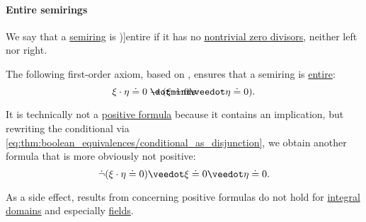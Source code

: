 \paragraph{Entire semirings}

\begin{definition}\label{def:entire_semiring}
  We say that a \hyperref[def:semiring]{semiring} is \term[ru=целостное (\cite[def. 3.5.1]{Винберг2014})]{entire} if it has no \hyperref[def:divisibility]{nontrivial zero divisors}, neither left nor right.
\end{definition}

\begin{remark}\label{rem:entire_semiring_axiom}
  The following first-order axiom, based on \cite[def. III.1.10]{Aluffi2009}, ensures that a semiring is \hyperref[def:entire_semiring]{entire}:
  \begin{equation}\label{eq:rem:entire_semiring_axiom}
    \xi \cdot \eta \syneq 0 \synimplies (\xi \syneq 0 \synvee \eta \syneq 0).
  \end{equation}

  It is technically not a \hyperref[def:positive_formula]{positive formula} because it contains an implication, but rewriting the conditional via \eqref{eq:thm:boolean_equivalences/conditional_as_disjunction}, we obtain another formula that is more obviously not positive:
  \begin{equation*}
    \synneg (\xi \cdot \eta \syneq 0) \synvee \xi \syneq 0 \synvee \eta \syneq 0.
  \end{equation*}

  As a side effect, results from  concerning positive formulas do not hold for \hyperref[def:integral_domain]{integral domains} and especially \hyperref[def:field]{fields}.
\end{remark}


